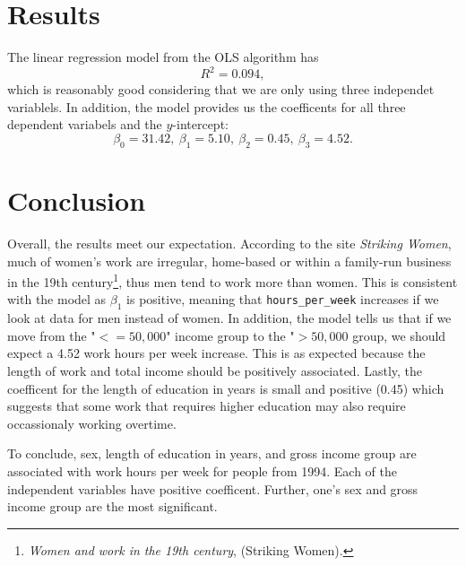 \documentclass{article}
\begin{document}
    \section{Results}
    The linear regression model from the OLS algorithm has \[
        R^2 = 0.094,
    \]
    which is reasonably good considering that we are only using three independet variablels. In addition, the model provides us the coefficents for all three dependent variabels and the $ y $-intercept: \[
        \beta_0 = 31.42,\ \beta_1 = 5.10,\ \beta_2 = 0.45,\ \beta_3 = 4.52.
    \]

    \section{Conclusion}

    Overall, the results meet our expectation. According to the site \textit{Striking Women}, much of women's work are irregular, home-based or within a family-run business in the 19th century\footnote{\textit{Women and work in the 19th century}, (Striking Women).}, thus men tend to work more than women. This is consistent with the model as $ \beta_1 $ is positive, meaning that \verb|hours_per_week| increases if we look at data for men instead of women. In addition, the model tells us that if we move from the "$<= 50,000$" income group to the "$> 50,000$ group, we should expect a 4.52 work hours per week increase. This is as expected because the length of work and total income should be positively associated. Lastly, the coefficent for the length of education in years is small and positive (0.45) which suggests that some work that requires higher education may also require occassionaly working overtime.
    
    To conclude, sex, length of education in years, and gross income group are associated with work hours per week for people from 1994. Each of the independent variables have positive coefficent. Further, one's sex and gross income group are the most significant.
    
\end{document}
